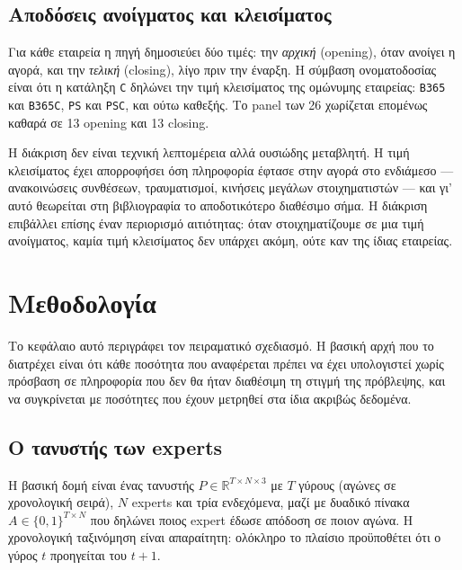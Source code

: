 \documentclass[12pt,a4paper,oneside]{report}
\newcommand{\file}[1]{\texttt{#1}}
\newcommand{\en}[1]{\textenglish{#1}}
\renewcommand{\_}{\oldunderscore\allowbreak}
\theoremstyle{definition}
\theoremstyle{plain}
\theoremstyle{remark}
\begin{document}
\section{Αποδόσεις ανοίγματος και κλεισίματος}
\label{sec:openclose}

Για κάθε εταιρεία η πηγή δημοσιεύει δύο τιμές: την \emph{αρχική} (\en{opening}), όταν
ανοίγει η αγορά, και την \emph{τελική} (\en{closing}), λίγο πριν την έναρξη. Η σύμβαση
ονοματοδοσίας είναι ότι η κατάληξη \file{C} δηλώνει την τιμή κλεισίματος της ομώνυμης
εταιρείας: \file{B365} και \file{B365C}, \file{PS} και \file{PSC}, και ούτω καθεξής. Το
panel των 26 χωρίζεται επομένως καθαρά σε 13 opening και 13 closing.

Η διάκριση δεν είναι τεχνική λεπτομέρεια αλλά ουσιώδης μεταβλητή. Η τιμή κλεισίματος έχει
απορροφήσει όση πληροφορία έφτασε στην αγορά στο ενδιάμεσο --- ανακοινώσεις συνθέσεων,
τραυματισμοί, κινήσεις μεγάλων στοιχηματιστών --- και γι' αυτό θεωρείται στη βιβλιογραφία το
αποδοτικότερο διαθέσιμο σήμα. Η διάκριση επιβάλλει επίσης έναν περιορισμό αιτιότητας: όταν
στοιχηματίζουμε σε μια τιμή ανοίγματος, καμία τιμή κλεισίματος δεν υπάρχει ακόμη, ούτε καν
της ίδιας εταιρείας.

\chapter{Μεθοδολογία}
\label{ch:method}

Το κεφάλαιο αυτό περιγράφει τον πειραματικό σχεδιασμό. Η βασική αρχή που το διατρέχει είναι
ότι κάθε ποσότητα που αναφέρεται πρέπει να έχει υπολογιστεί χωρίς πρόσβαση σε πληροφορία που
δεν θα ήταν διαθέσιμη τη στιγμή της πρόβλεψης, και να συγκρίνεται με ποσότητες που έχουν
μετρηθεί στα ίδια ακριβώς δεδομένα.

\section{Ο τανυστής των experts}

Η βασική δομή είναι ένας τανυστής $P \in \mathbb{R}^{T \times N \times 3}$ με $T$ γύρους
(αγώνες σε χρονολογική σειρά), $N$ experts και τρία ενδεχόμενα, μαζί με δυαδικό πίνακα
$A \in \{0,1\}^{T \times N}$ που δηλώνει ποιος expert έδωσε απόδοση σε ποιον αγώνα. Η
χρονολογική ταξινόμηση είναι απαραίτητη: ολόκληρο το πλαίσιο προϋποθέτει ότι ο γύρος $t$
προηγείται του $t+1$.
\end{document}
